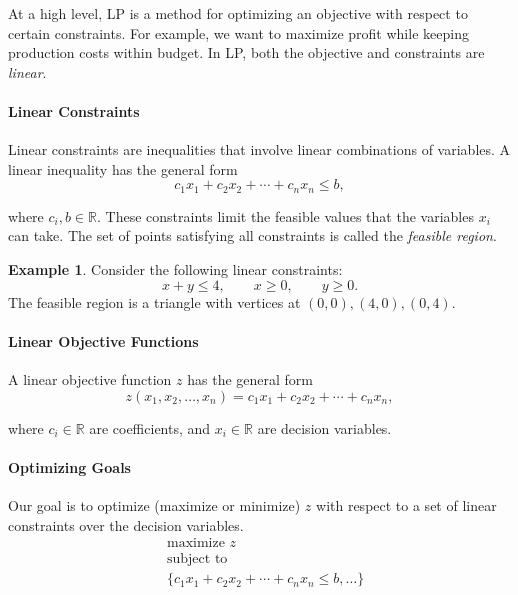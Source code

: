 \documentclass[oneside,11pt,dvipsnames]{book}
\numberwithin{equation}{section}
\theoremstyle{definition}
\newtheorem{example}{Example}[section]
\theoremstyle{remark}
\begin{document}
At a high level, LP is a method for optimizing an objective with respect to certain constraints. For example, we want to maximize profit while keeping production costs within budget. In LP, both the objective and constraints are \emph{linear}.


\paragraph{Linear Constraints}

Linear constraints are inequalities that involve linear combinations of variables.  A linear inequality has the general form
\[
c_1x_1 + c_2x_2 + \cdots + c_nx_n \leq b,
\]

where $c_i, b \in \mathbb{R}$. These constraints limit the feasible values that the variables $x_i$ can take.
The set of points satisfying all constraints is called the \emph{feasible region}.


\begin{example}
Consider the following linear constraints:
\[
x + y \leq 4, \qquad x \geq 0, \qquad y \geq 0.
\]
The feasible region is a triangle with vertices at $(0,0), (4,0), (0,4)$.

\begin{center}
\end{center}
\end{example}

\paragraph{Linear Objective Functions}
A linear objective function $z$ has the general form
\[
z(x_1, x_2, \ldots, x_n) = c_1x_1 + c_2x_2 + \cdots + c_nx_n,
\]

where $c_i \in \mathbb{R}$ are coefficients, and $x_i \in \mathbb{R}$ are decision variables. 


\paragraph{Optimizing Goals}
Our goal is to optimize (maximize or minimize) $z$ with respect to a set of linear constraints over the decision variables.
\[
\begin{aligned}
& \text{maximize } z \\
& \text{subject to } \\
& \{c_1x_1 + c_2x_2 + \cdots + c_nx_n \leq b, \ldots    \}
\end{aligned}
\]
\end{document}
